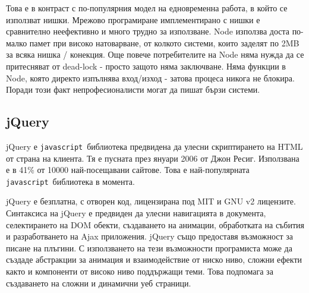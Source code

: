 \documentclass[a4paper]{article}
\def\js{\texttt{javascript}}
\begin{document}
  Това е в контраст с по-популярния модел на едновременна работа, в който се използват нишки. Мрежово програмиране имплементирано с нишки е сравнително неефективно и много трудно за използване. Node използва доста по-малко памет при високо натоварване, от колкото системи, които заделят по 2MB за всяка нишка / конекция. Още повече потребителите на Node няма нужда да се притесняват от dead-lock - просто защото няма заключване. Няма функции в Node, която директо изпълнява вход/изход - затова процеса никога не блокира. Поради този факт непрофесионалисти могат да пишат бързи системи.

    
  \subsection{jQuery}
  jQuery \cite{jquery} е \js\ библиотека предвидена да улесни скриптирането на HTML от страна на клиента. Тя е пусната през януари 2006 от Джон Ресиг. Използвана е в 41\% от 10000 най-посещавани сайтове. Това е най-популярната \js\ библиотека в момента.

  jQuery е безплатна, с отворен код, лицензирана под MIT и GNU v2 лицензите. Синтаксиса на jQuery е предвиден да улесни навигацията в документа, селектирането на DOM обекти, създаването на анимации, обработката на събития и разработването на Ajax приложения. jQuery също предоставя възможност за писане на плъгини. С използването на тези възможности програмиста може да създаде абстракции за анимация и взаимодействие от ниско ниво, сложни ефекти както и компоненти от високо ниво поддържащи теми. Това подпомага за създаването на сложни и динамични уеб страници.
\end{document}

